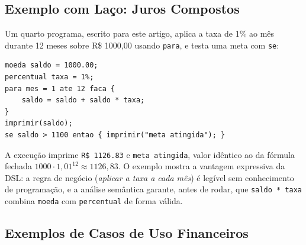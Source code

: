 \documentclass[conference]{IEEEtran}
\begin{document}
\subsection{Exemplo com Laço: Juros Compostos}

Um quarto programa, escrito para este artigo, aplica a taxa de 1\% ao mês durante 12 meses sobre R\$ 1000,00 usando \texttt{para}, e testa uma meta com \texttt{se}:
\begin{minipage}{\columnwidth}\begin{lstlisting}
moeda saldo = 1000.00;
percentual taxa = 1%;
para mes = 1 ate 12 faca {
    saldo = saldo + saldo * taxa;
}
imprimir(saldo);
se saldo > 1100 entao { imprimir("meta atingida"); }
\end{lstlisting}\end{minipage}\par\smallskip
A execução imprime \texttt{R\$ 1126.83} e \texttt{meta atingida}, valor idêntico ao da fórmula fechada $1000 \cdot 1{,}01^{12} \approx 1126{,}83$. O exemplo mostra a vantagem expressiva da DSL: a regra de negócio (\textit{aplicar a taxa a cada mês}) é legível sem conhecimento de programação, e a análise semântica garante, antes de rodar, que \texttt{saldo * taxa} combina \texttt{moeda} com \texttt{percentual} de forma válida.

\subsection{Exemplos de Casos de Uso Financeiros}
\end{document}
